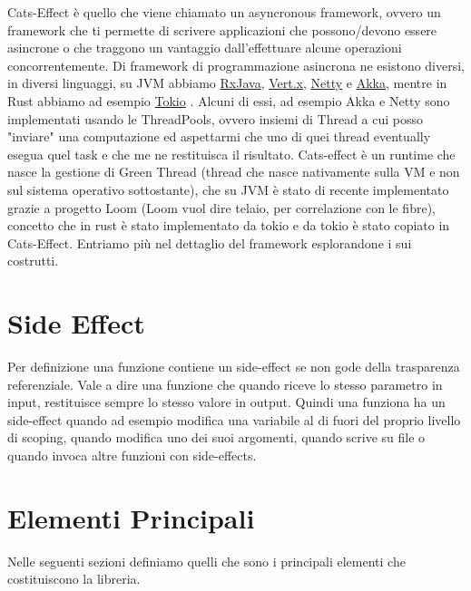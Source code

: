 Cats-Effect è quello che viene chiamato un asyncronous framework, ovvero un framework che ti permette di scrivere applicazioni che possono/devono essere asincrone o che traggono un vantaggio dall'effettuare alcune operazioni concorrentemente.  Di framework di programmazione asincrona ne esistono diversi, in diversi linguaggi, su JVM abbiamo \href{https://github.com/ReactiveX/RxJava}{RxJava}, \href{https://vertx.io/}{Vert.x}, \href{https://netty.io/}{Netty} e \href{https://akka.io/}{Akka}, mentre in Rust abbiamo ad esempio \href{https://tokio.rs/}{Tokio} . Alcuni di essi, ad esempio Akka e Netty sono implementati usando le ThreadPools, ovvero insiemi di Thread a cui posso "inviare" una computazione ed aspettarmi che uno di quei thread eventually esegua quel task e che me ne restituisca il risultato. Cats-effect è un runtime che nasce la gestione di Green Thread (thread che nasce nativamente sulla VM e non sul sistema operativo sottostante), che su JVM è stato di recente implementato grazie a progetto Loom (Loom vuol dire telaio, per correlazione con le fibre), concetto che in rust è stato implementato da tokio e da tokio è stato copiato in Cats-Effect. Entriamo più nel dettaglio del framework esplorandone i sui costrutti. 

\section{Side Effect}
Per definizione una funzione contiene un side-effect se non gode della trasparenza referenziale. Vale a dire una funzione che quando riceve lo stesso parametro in input, restituisce sempre lo stesso valore in output. Quindi una funziona ha un side-effect quando ad esempio modifica una variabile al di fuori del proprio livello di scoping, quando modifica uno dei suoi argomenti, quando scrive su file o quando invoca altre funzioni con side-effects.

\section{Elementi Principali}
Nelle seguenti sezioni definiamo quelli che sono i principali elementi che costituiscono la libreria.
